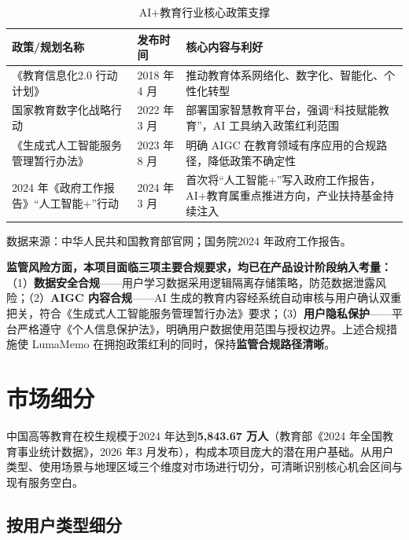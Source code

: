 \begin{table}[htbp]
  \centering
  \caption{AI+教育行业核心政策支撑}
  \label{tab:policy}
  \begin{tabular}{p{5.0cm}p{2.0cm}p{5.5cm}}
    \toprule
    \textbf{政策/规划名称} & \textbf{发布时间} & \textbf{核心内容与利好} \\
    \midrule
    《教育信息化2.0 行动计划》 & 2018 年4 月 & 推动教育体系网络化、数字化、智能化、个性化转型 \\[4pt]
    国家教育数字化战略行动 & 2022 年3 月 & 部署国家智慧教育平台，强调“科技赋能教育”，AI 工具纳入政策红利范围 \\[4pt]
    《生成式人工智能服务管理暂行办法》 & 2023 年8 月 & 明确 AIGC 在教育领域有序应用的合规路径，降低政策不确定性 \\[4pt]
    2024 年《政府工作报告》“人工智能+”行动 & 2024 年3 月 & 首次将“人工智能+”写入政府工作报告，AI+教育属重点推进方向，产业扶持基金持续注入 \\
    \bottomrule
  \end{tabular}
  \begin{flushleft}
    \footnotesize 数据来源：中华人民共和国教育部官网；国务院2024 年政府工作报告。
  \end{flushleft}
\end{table}

\textbf{监管风险方面，本项目面临三项主要合规要求，均已在产品设计阶段纳入考量：}（1）\textbf{数据安全合规}——用户学习数据采用逻辑隔离存储策略，防范数据泄露风险；（2）\textbf{AIGC 内容合规}——AI 生成的教育内容经系统自动审核与用户确认双重把关，符合《生成式人工智能服务管理暂行办法》要求；（3）\textbf{用户隐私保护}——平台严格遵守《个人信息保护法》，明确用户数据使用范围与授权边界。上述合规措施使 LumaMemo 在拥抱政策红利的同时，保持\textbf{监管合规路径清晰}。

\section{市场细分}

中国高等教育在校生规模于2024 年达到\textbf{5,843.67 万人}（教育部《2024 年全国教育事业统计数据》，2026 年3 月发布），构成本项目庞大的潜在用户基础。从用户类型、使用场景与地理区域三个维度对市场进行切分，可清晰识别核心机会区间与现有服务空白。

\subsection{按用户类型细分}

